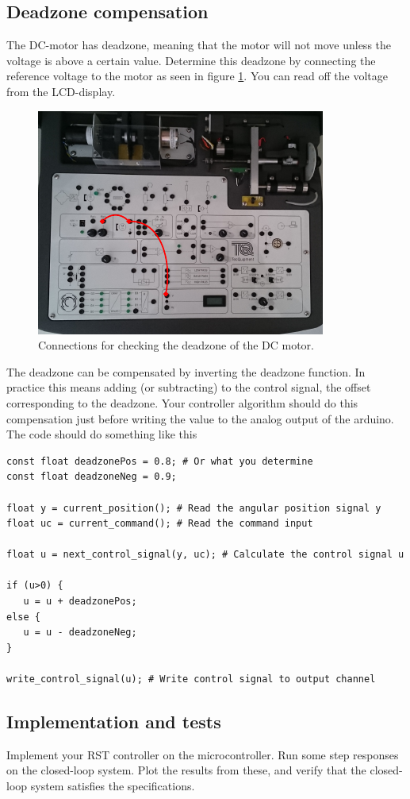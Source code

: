 \documentclass[a4paper]{scrartcl}
\begin{document}
\subsection*{Deadzone compensation}
\label{sec-5-3}
The DC-motor has  deadzone, meaning that the motor will not move unless the voltage is above a certain value. Determine this deadzone by connecting the reference voltage to the motor as seen in figure \ref{fig:deadzone-experiment}. You can read off the voltage from the LCD-display.
\begin{figure}
\begin{center}
\includegraphics[width=0.6\linewidth]{figures/deadzone-setup}
\caption{Connections for checking the deadzone of the DC motor.}
\label{fig:deadzone-experiment}
\end{center}
\end{figure}

The deadzone can be compensated by inverting the deadzone function. In practice this means  adding (or subtracting) to the control signal, the offset corresponding to the deadzone. Your controller algorithm should do this compensation just before writing the value to the analog output of the arduino. The code should do something like this
\begin{verbatim}
const float deadzonePos = 0.8; # Or what you determine
const float deadzoneNeg = 0.9;

float y = current_position(); # Read the angular position signal y
float uc = current_command(); # Read the command input

float u = next_control_signal(y, uc); # Calculate the control signal u

if (u>0) {
   u = u + deadzonePos;
else {
   u = u - deadzoneNeg;
}

write_control_signal(u); # Write control signal to output channel
\end{verbatim}

\subsection*{Implementation and tests}
\label{sec-5-4}
Implement your RST controller on the microcontroller. Run some step responses on the closed-loop system. Plot the results from these, and verify that the closed-loop system satisfies the specifications.
\end{document}
